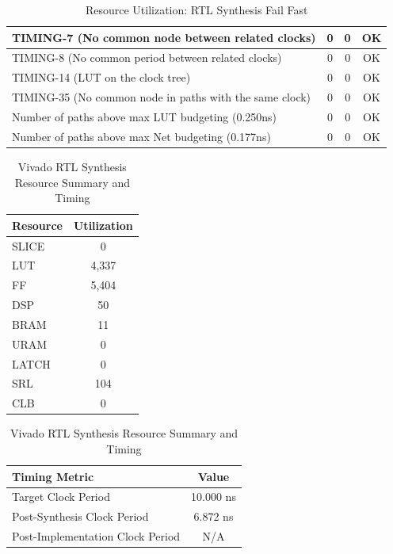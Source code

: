 \documentclass{article}
\begin{document}
\begin{table}[H]
{\begin{tabular}{|l|c|c|c|}
    TIMING-7 (No common node between related clocks)                   & 0                  & 0               & OK              \\ \hline
    TIMING-8 (No common period between related clocks)                 & 0                  & 0               & OK              \\ \hline
    TIMING-14 (LUT on the clock tree)                                  & 0                  & 0               & OK              \\ \hline
    TIMING-35 (No common node in paths with the same clock)            & 0                  & 0               & OK              \\ \hline
    Number of paths above max LUT budgeting (0.250ns)                 & 0                  & 0               & OK              \\ \hline
    Number of paths above max Net budgeting (0.177ns)                 & 0                  & 0               & OK              \\ \hline
    \end{tabular}
    }
    \caption{\centering Resource Utilization: RTL Synthesis Fail Fast}
    \label{tab:mlp-failfast-summary}
\end{table}

\begin{table}[H]
    \centering
    \begin{tabular}{|l|c|}
        \hline
        \textbf{Resource} & \textbf{Utilization} \\
        \hline
        SLICE & 0 \\
        LUT & 4,337 \\
        FF & 5,404 \\
        DSP & 50 \\
        BRAM & 11 \\
        URAM & 0 \\
        LATCH & 0 \\
        SRL & 104 \\
        CLB & 0 \\
        \hline
    \end{tabular}

    \vspace{5mm}

    \begin{tabular}{|l|c|}
        \hline
        \textbf{Timing Metric} & \textbf{Value} \\
        \hline
        Target Clock Period & 10.000 ns \\
        Post-Synthesis Clock Period & 6.872 ns \\
        Post-Implementation Clock Period & N/A \\
        \hline
    \end{tabular}

    \caption{Vivado RTL Synthesis Resource Summary and Timing}
\end{table}
\end{document}
